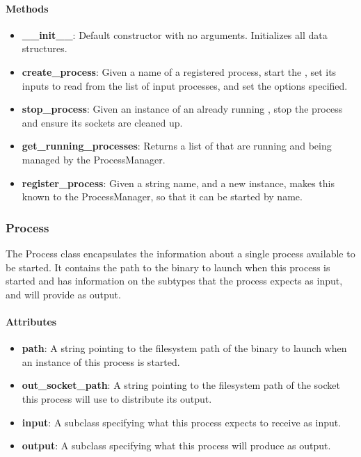 \documentclass[titlepage]{article}
\begin{document}
\paragraph{Methods}
\begin{itemize}
    \item \textbf{\_\_init\_\_}: Default constructor with no arguments.
        Initializes all data structures.
    \item \textbf{create\_process}: Given a name of a registered process, start
        the , set its inputs to read from the list of
        input processes, and set the options specified.
    \item \textbf{stop\_process}: Given an instance of an already running
        , stop the process and ensure its sockets are
        cleaned up.
    \item \textbf{get\_running\_processes}: Returns a list of
         that are running and being managed by the
        ProcessManager.
    \item \textbf{register\_process}: Given a string name, and a new
         instance, makes this known to the
        ProcessManager, so that it can be started by name.
\end{itemize}


\subsubsection{Process
    \label{class-process}
}

The Process class encapsulates the information about a single process available
to be started.  It contains the path to the binary to launch when this process
is started and has information on the  subtypes
that the process expects as input, and will provide as output.

\paragraph{Attributes}
\begin{itemize}
    \item \textbf{path}: A string pointing to the filesystem path of the binary
        to launch when an instance of this process is started.
    \item \textbf{out\_socket\_path}: A string pointing to the filesystem path of the socket
        this process will use to distribute its output.
    \item \textbf{input}: A  subclass specifying what
        this process expects to receive as input.
    \item \textbf{output}: A  subclass specifying what
        this process will produce as output.
\end{itemize}
\end{document}
